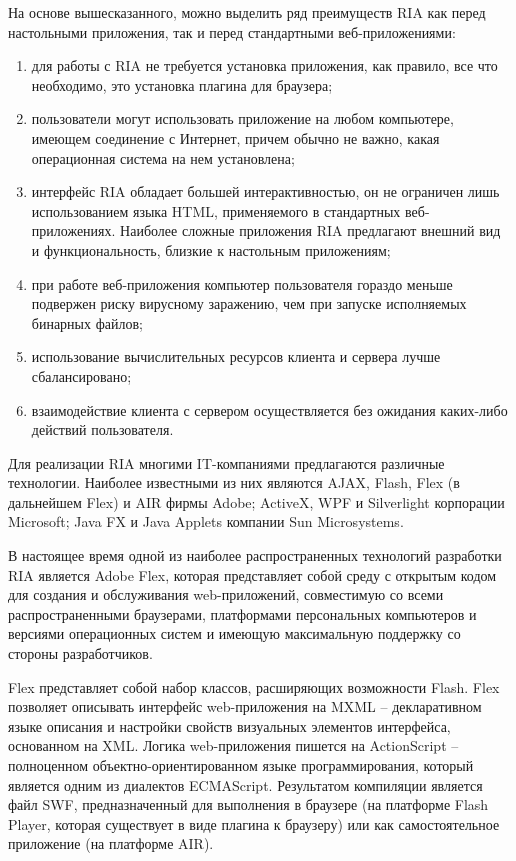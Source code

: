 На основе вышесказанного, можно выделить ряд преимуществ RIA как перед настольными приложения,
так и перед стандартными веб-приложениями:

\begin{enumerate}
\item для работы с RIA не требуется установка приложения, как правило, все что необходимо, это установка плагина
для браузера;
\item пользователи могут использовать приложение на любом компьютере, имеющем соединение с Интернет,
причем обычно не важно, какая операционная система на нем установлена;
\item интерфейс RIA обладает большей интерактивностью, он не ограничен лишь использованием языка
HTML, применяемого в стандартных веб-приложениях. Наиболее сложные приложения RIA предлагают 
внешний вид и функциональность, близкие к настольным приложениям;
\item при работе веб-приложения компьютер пользователя гораздо меньше подвержен риску
вирусному заражению, чем при запуске исполняемых бинарных файлов;
\item использование вычислительных ресурсов клиента и сервера лучше сбалансировано;
\item взаимодействие клиента с сервером осуществляется без ожидания каких-либо действий
пользователя.
\end{enumerate}

Для реализации RIA многими IT-компаниями предлагаются различные технологии. Наиболее известными из 
них являются AJAX, Flash, Flex (в дальнейшем Flex) и AIR фирмы Adobe; ActiveX, WPF и Silverlight
корпорации Microsoft; Java FX и Java Applets компании Sun Microsystems.

В настоящее время одной из наиболее распространенных технологий разработки RIA является Adobe Flex,
которая представляет собой среду с открытым кодом для создания и обслуживания web-приложений,
совместимую со всеми распространенными браузерами, платформами персональных компьютеров и версиями
операционных систем и имеющую максимальную поддержку со стороны разработчиков. 

Flex представляет собой набор классов, расширяющих возможности Flash. Flex позволяет описывать
интерфейс web-приложения на MXML – декларативном языке описания и настройки свойств визуальных 
элементов интерфейса, основанном на XML. Логика web-приложения пишется на ActionScript – полноценном
объектно-ориентированном языке программирования, который является одним из диалектов ECMAScript.
Результатом компиляции является файл SWF, предназначенный для выполнения в браузере (на платформе
Flash Player, которая существует в виде плагина к браузеру) или как самостоятельное приложение (на
платформе AIR).

